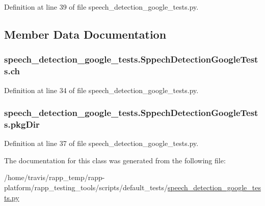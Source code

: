 Definition at line 39 of file speech\-\_\-detection\-\_\-google\-\_\-tests.\-py.



\subsection{Member Data Documentation}
\hypertarget{classspeech__detection__google__tests_1_1SppechDetectionGoogleTests_adcbbee62af2f82b031ef7a0e0e3ab41f}{
\subsubsection[{ch}]{\setlength{\rightskip}{0pt plus 5cm}speech\-\_\-detection\-\_\-google\-\_\-tests.\-Sppech\-Detection\-Google\-Tests.\-ch}}\label{classspeech__detection__google__tests_1_1SppechDetectionGoogleTests_adcbbee62af2f82b031ef7a0e0e3ab41f}


Definition at line 34 of file speech\-\_\-detection\-\_\-google\-\_\-tests.\-py.

\hypertarget{classspeech__detection__google__tests_1_1SppechDetectionGoogleTests_af121fc5d70b62376c9e79087e71c7ad1}{
\subsubsection[{pkg\-Dir}]{\setlength{\rightskip}{0pt plus 5cm}speech\-\_\-detection\-\_\-google\-\_\-tests.\-Sppech\-Detection\-Google\-Tests.\-pkg\-Dir}}\label{classspeech__detection__google__tests_1_1SppechDetectionGoogleTests_af121fc5d70b62376c9e79087e71c7ad1}


Definition at line 37 of file speech\-\_\-detection\-\_\-google\-\_\-tests.\-py.



The documentation for this class was generated from the following file\-:\begin{DoxyCompactItemize}
\item 
/home/travis/rapp\-\_\-temp/rapp-\/platform/rapp\-\_\-testing\-\_\-tools/scripts/default\-\_\-tests/\hyperlink{speech__detection__google__tests_8py}{speech\-\_\-detection\-\_\-google\-\_\-tests.\-py}\end{DoxyCompactItemize}
